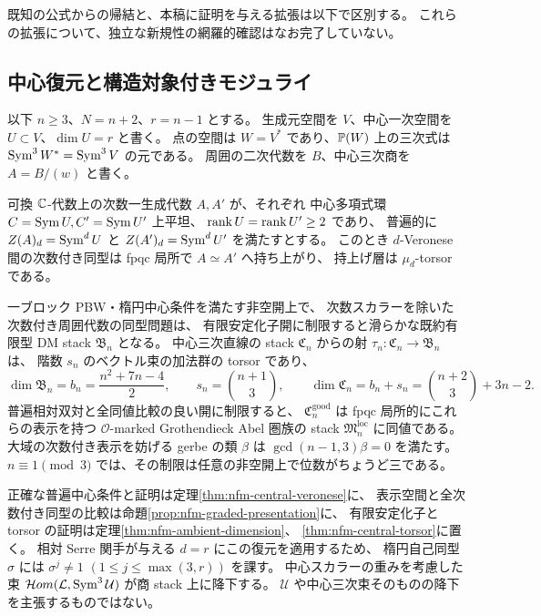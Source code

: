 既知の公式からの帰結と、本稿に証明を与える拡張は以下で区別する。
これらの拡張について、独立な新規性の網羅的確認はなお完了していない。

\subsection{中心復元と構造対象付きモジュライ}
以下 $n\ge3$、$N=n+2$、$r=n-1$ とする。
生成元空間を $V$、中心一次空間を $U\subset V$、$\dim U=r$ と書く。
点の空間は $W=V^*$ であり、$\mathbb P(W)$ 上の三次式は
$\operatorname{Sym}^3W^*=\operatorname{Sym}^3V$ の元である。
周囲の二次代数を $B$、中心三次商を $A=B/(w)$ と書く。

\begin{maintheorem}[中心復元と局所一ブロック型モジュライ]
可換 $\mathbb C$-代数上の次数一生成代数 $A,A'$ が、それぞれ
中心多項式環 $C=\operatorname{Sym} U,C'=\operatorname{Sym} U'$ 上平坦、
$\operatorname{rank} U=\operatorname{rank} U'\ge2$ であり、
普遍的に $Z(A)_d=\operatorname{Sym}^dU$ と $Z(A')_d=\operatorname{Sym}^dU'$ を満たすとする。
このとき $d$-Veronese 間の次数付き同型は fpqc 局所で $A\simeq A'$ へ持ち上がり、
持上げ層は $\mu_d$-torsor である。

一ブロック PBW・楕円中心条件を満たす非空開上で、
次数スカラーを除いた次数付き周囲代数の同型問題は、
有限安定化子開に制限すると滑らかな既約有限型 DM stack $\mathfrak B_n$ となる。
中心三次直線の stack $\mathfrak C_n$ からの射
$\tau_n:\mathfrak C_n\to\mathfrak B_n$ は、
階数 $s_n$ のベクトル束の加法群の torsor であり、
\[
 \dim\mathfrak B_n=b_n=\frac{n^2+7n-4}{2},\qquad
 s_n=\binom{n+1}{3},\qquad
 \dim\mathfrak C_n=b_n+s_n=\binom{n+2}{3}+3n-2.
\]
普遍相対双対と全同値比較の良い開に制限すると、
$\mathfrak C_n^{\mathrm{good}}$ は fpqc 局所的にこれらの表示を持つ
$\mathcal O$-marked Grothendieck Abel 圏族の stack
$\mathfrak M_n^{\mathrm{loc}}$ に同値である。
大域の次数付き表示を妨げる gerbe の類 $\beta$ は
$\gcd(n-1,3)\beta=0$ を満たす。
$n\equiv1\pmod3$ では、その制限は任意の非空開上で位数がちょうど三である。
\end{maintheorem}

正確な普遍中心条件と証明は定理\ref{thm:nfm-central-veronese}に、
表示空間と全次数付き同型の比較は命題\ref{prop:nfm-graded-presentation}に、
有限安定化子と torsor の証明は定理\ref{thm:nfm-ambient-dimension}、
\ref{thm:nfm-central-torsor}に置く。
相対 Serre 関手が与える $d=r$ にこの復元を適用するため、
楕円自己同型 $\sigma$ には
$\sigma^j\ne1$ $(1\le j\le\max(3,r))$ を課す。
中心スカラーの重みを考慮した束
$\mathcal Hom(\mathcal L,\operatorname{Sym}^3\mathcal U)$ が商 stack 上に降下する。
$\mathcal U$ や中心三次束そのものの降下を主張するものではない。

